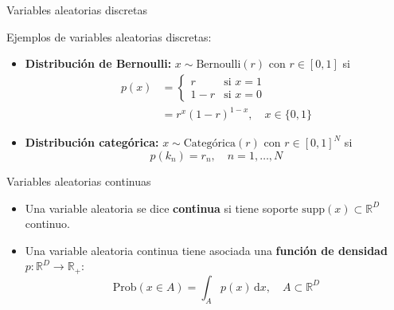 \documentclass{beamer}
\newcommand{\R}{\mathbb{R}}
\begin{document}
\begin{frame}{Variables aleatorias discretas}

    Ejemplos de variables aleatorias discretas:

    \begin{itemize}
        \item \textbf{Distribución de Bernoulli:} $x\sim \text{Bernoulli}(r)$ con $r\in[0,1]$ si
              \begin{align*}
                  p(x) & =\begin{cases}
                              r   & \text{si } x=1 \\
                              1-r & \text{si } x=0
                          \end{cases}               \\
                       & = r^x(1-r)^{1-x}, \quad x\in\{0,1\}
              \end{align*}

        \item \textbf{Distribución categórica:} $x\sim\text{Categórica}(r)$ con $r\in[0,1]^N$ si
              \begin{equation*}
                  p(k_n)=r_n,\quad n=1,\ldots,N
              \end{equation*}
    \end{itemize}
\end{frame}


\begin{frame}{Variables aleatorias continuas}

    \begin{itemize}
        \item Una variable aleatoria se dice \textbf{continua} si tiene soporte $\text{supp}(x)\subset\R^D$ continuo.
        \item Una variable aleatoria continua tiene asociada una \textbf{función de densidad} $p:\R^D\to\R_+$:
              \begin{equation*}
                  \text{Prob}(x\in A)=\int_A p(x)\,\text{d}x, \quad A\subset\R^D
              \end{equation*}
    \end{itemize}

\end{frame}
\end{document}
